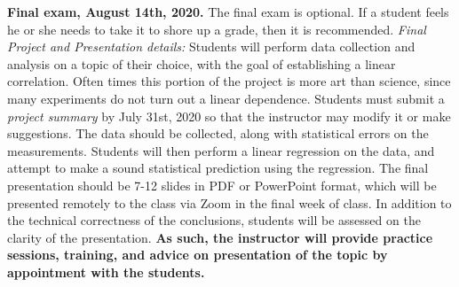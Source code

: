 \documentclass[10pt]{article}
\begin{document}
\begin{outline}[enumerate]
\1 \textbf{Final exam, August 14th, 2020.} The final exam is optional.  If a student feels he or she needs to take it to shore up a grade, then it is recommended.
\1 \textit{Final Project and Presentation details:}
Students will perform data collection and analysis on a topic of their choice, with the goal of establishing a linear correlation.  Often times this portion of the project is more art than science, since many experiments do not turn out a linear dependence.  Students must submit a \textit{project summary} by July 31st, 2020 so that the instructor may modify it or make suggestions.  The data should be collected, along with statistical errors on the measurements.  Students will then perform a linear regression on the data, and attempt to make a sound statistical prediction using the regression.  The final presentation should be 7-12 slides in PDF or PowerPoint format, which will be presented remotely to the class via Zoom in the final week of class.  In addition to the technical correctness of the conclusions, students will be assessed on the clarity of the presentation.  \textbf{As such, the instructor will provide practice sessions, training, and advice on presentation of the topic by appointment with the students.}
\end{outline}
\end{document}
